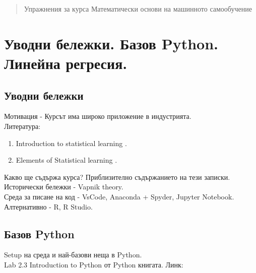 \documentclass{article}
\begin{document}
	\newpage
	\date{}
	\maketitle

	\begin{abstract}
		Упражнения за курса Математически основи на машинното самообучение
	\end{abstract}
	
	\tableofcontents
		


	\section{Уводни бележки. Базов Python. Линейна регресия.}
	\subsection{Уводни бележки}
	Мотивация - Курсът има широко приложение в индустрията.\\	
	Литература:
	\begin{enumerate}
	\item  Introduction to statistical learning \cite{james2023introduction}.
	\item  Elements of Statistical learning  \cite{hastie01statisticallearning}.
	\end{enumerate}
	
	\noindent
	Какво ще съдържа курса? Приблизително съдържанието на тези записки. \\
	
	\noindent
	Исторически бележки - Vapnik theory. \\

	\noindent	
	Среда за писане на код - VsCode, Anaconda + Spyder, Jupyter Notebook. \\
 	Алтернативно - R, R Studio.
 	\subsection{Базов Python}
 	Setup на среда и най-базови неща в Python.\\
 	
 	Lab 2.3 Introduction to Python от Python книгата. Линк: \\
\end{document}

